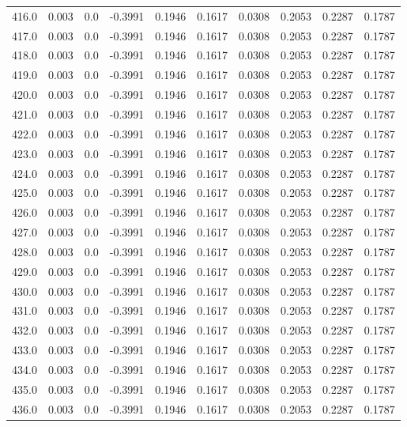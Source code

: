 \begin{longtable}{lrrrrrrrrr}
416.0 & 0.003 & 0.0 & -0.3991 & 0.1946 & 0.1617 & 0.0308 & 0.2053 & 0.2287 & 0.1787 \\
417.0 & 0.003 & 0.0 & -0.3991 & 0.1946 & 0.1617 & 0.0308 & 0.2053 & 0.2287 & 0.1787 \\
418.0 & 0.003 & 0.0 & -0.3991 & 0.1946 & 0.1617 & 0.0308 & 0.2053 & 0.2287 & 0.1787 \\
419.0 & 0.003 & 0.0 & -0.3991 & 0.1946 & 0.1617 & 0.0308 & 0.2053 & 0.2287 & 0.1787 \\
420.0 & 0.003 & 0.0 & -0.3991 & 0.1946 & 0.1617 & 0.0308 & 0.2053 & 0.2287 & 0.1787 \\
421.0 & 0.003 & 0.0 & -0.3991 & 0.1946 & 0.1617 & 0.0308 & 0.2053 & 0.2287 & 0.1787 \\
422.0 & 0.003 & 0.0 & -0.3991 & 0.1946 & 0.1617 & 0.0308 & 0.2053 & 0.2287 & 0.1787 \\
423.0 & 0.003 & 0.0 & -0.3991 & 0.1946 & 0.1617 & 0.0308 & 0.2053 & 0.2287 & 0.1787 \\
424.0 & 0.003 & 0.0 & -0.3991 & 0.1946 & 0.1617 & 0.0308 & 0.2053 & 0.2287 & 0.1787 \\
425.0 & 0.003 & 0.0 & -0.3991 & 0.1946 & 0.1617 & 0.0308 & 0.2053 & 0.2287 & 0.1787 \\
426.0 & 0.003 & 0.0 & -0.3991 & 0.1946 & 0.1617 & 0.0308 & 0.2053 & 0.2287 & 0.1787 \\
427.0 & 0.003 & 0.0 & -0.3991 & 0.1946 & 0.1617 & 0.0308 & 0.2053 & 0.2287 & 0.1787 \\
428.0 & 0.003 & 0.0 & -0.3991 & 0.1946 & 0.1617 & 0.0308 & 0.2053 & 0.2287 & 0.1787 \\
429.0 & 0.003 & 0.0 & -0.3991 & 0.1946 & 0.1617 & 0.0308 & 0.2053 & 0.2287 & 0.1787 \\
430.0 & 0.003 & 0.0 & -0.3991 & 0.1946 & 0.1617 & 0.0308 & 0.2053 & 0.2287 & 0.1787 \\
431.0 & 0.003 & 0.0 & -0.3991 & 0.1946 & 0.1617 & 0.0308 & 0.2053 & 0.2287 & 0.1787 \\
432.0 & 0.003 & 0.0 & -0.3991 & 0.1946 & 0.1617 & 0.0308 & 0.2053 & 0.2287 & 0.1787 \\
433.0 & 0.003 & 0.0 & -0.3991 & 0.1946 & 0.1617 & 0.0308 & 0.2053 & 0.2287 & 0.1787 \\
434.0 & 0.003 & 0.0 & -0.3991 & 0.1946 & 0.1617 & 0.0308 & 0.2053 & 0.2287 & 0.1787 \\
435.0 & 0.003 & 0.0 & -0.3991 & 0.1946 & 0.1617 & 0.0308 & 0.2053 & 0.2287 & 0.1787 \\
436.0 & 0.003 & 0.0 & -0.3991 & 0.1946 & 0.1617 & 0.0308 & 0.2053 & 0.2287 & 0.1787 \\

\end{longtable}
